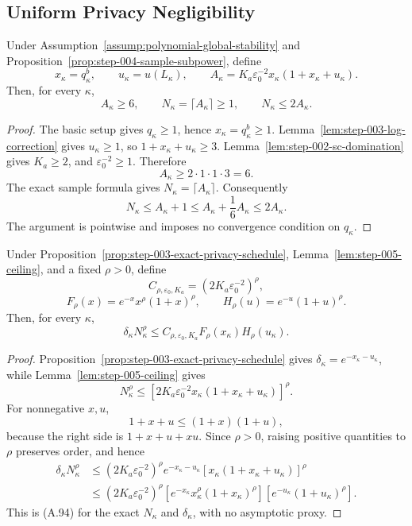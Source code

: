 \subsection{Uniform Privacy Negligibility}\label{app:privacy-negligibility}

\begin{lemma}
\label{lem:step-005-ceiling}
Under Assumption~\ref{assump:polynomial-global-stability} and
Proposition~\ref{prop:step-004-sample-subpower}, define
\[
x_\kappa=q_\kappa^b,\qquad
u_\kappa=u(L_\kappa),\qquad
A_\kappa=
K_a\varepsilon_0^{-2}
x_\kappa(1+x_\kappa+u_\kappa).
\]
Then, for every \(\kappa\),
\[
A_\kappa\geq6,\qquad
N_\kappa=\lceil A_\kappa\rceil\geq1,\qquad
N_\kappa\leq2A_\kappa.
\tag{A.93}
\]
\end{lemma}

\begin{proof}
The basic setup gives \(q_\kappa\geq1\), hence
\(x_\kappa=q_\kappa^b\geq1\).
Lemma~\ref{lem:step-003-log-correction} gives \(u_\kappa\geq1\), so
\(1+x_\kappa+u_\kappa\geq3\).
Lemma~\ref{lem:step-002-sc-domination} gives \(K_a\geq2\), and
\(\varepsilon_0^{-2}\geq1\).  Therefore
\[
A_\kappa
\geq2\cdot1\cdot1\cdot3=6.
\]
The exact sample formula gives \(N_\kappa=\lceil A_\kappa\rceil\).
Consequently
\[
N_\kappa
\leq A_\kappa+1
\leq A_\kappa+\frac16A_\kappa
\leq2A_\kappa.
\]
The argument is pointwise and imposes no convergence condition on
\(q_\kappa\).
\end{proof}

\begin{lemma}
\label{lem:step-005-factorization}
Under Proposition~\ref{prop:step-003-exact-privacy-schedule},
Lemma~\ref{lem:step-005-ceiling}, and a fixed \(\rho>0\), define
\[
C_{\rho,\varepsilon_0,K_a}
=(2K_a\varepsilon_0^{-2})^\rho,
\]
\[
F_\rho(x)=e^{-x}x^\rho(1+x)^\rho,\qquad
H_\rho(u)=e^{-u}(1+u)^\rho.
\]
Then, for every \(\kappa\),
\[
\delta_\kappa N_\kappa^\rho
\leq
C_{\rho,\varepsilon_0,K_a}
F_\rho(x_\kappa)H_\rho(u_\kappa).
\tag{A.94}
\]
\end{lemma}

\begin{proof}
Proposition~\ref{prop:step-003-exact-privacy-schedule} gives
\(\delta_\kappa=e^{-x_\kappa-u_\kappa}\), while
Lemma~\ref{lem:step-005-ceiling} gives
\[
N_\kappa^\rho
\leq
\left[
2K_a\varepsilon_0^{-2}
x_\kappa(1+x_\kappa+u_\kappa)
\right]^\rho.
\]
For nonnegative \(x,u\),
\[
1+x+u\leq(1+x)(1+u),
\tag{A.95}
\]
because the right side is \(1+x+u+xu\).  Since \(\rho>0\), raising
positive quantities to \(\rho\) preserves order, and hence
\[
\begin{aligned}
\delta_\kappa N_\kappa^\rho
&\leq
(2K_a\varepsilon_0^{-2})^\rho
e^{-x_\kappa-u_\kappa}
[x_\kappa(1+x_\kappa+u_\kappa)]^\rho\\
&\leq
(2K_a\varepsilon_0^{-2})^\rho
[e^{-x_\kappa}x_\kappa^\rho(1+x_\kappa)^\rho]
[e^{-u_\kappa}(1+u_\kappa)^\rho].
\end{aligned}
\tag{A.96}
\]
This is (A.94) for the exact \(N_\kappa\) and
\(\delta_\kappa\), with no asymptotic proxy.
\end{proof}

